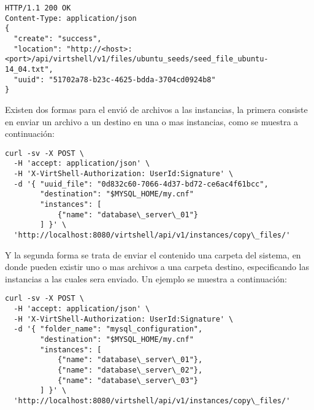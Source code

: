 \vspace{5mm}

\begin{lstlisting}[style=json, caption=Respuesta HTTP del almacenamiento de un archivo.]
HTTP/1.1 200 OK
Content-Type: application/json
{ 
  "create": "success",
  "location": "http://<host>:<port>/api/virtshell/v1/files/ubuntu_seeds/seed_file_ubuntu-14_04.txt",
  "uuid": "51702a78-b23c-4625-bdda-3704cd0924b8" 
}
\end{lstlisting}

\vspace{5mm}

Existen dos formas para el envió de archivos a las instancias, la primera consiste en enviar un archivo a un destino en una o mas instancias, como se muestra a continuación:

\vspace{2cm}

\begin{lstlisting}[style=json, caption=Ejemplo del envio de un archivo a una instancia.]
curl -sv -X POST \
  -H 'accept: application/json' \
  -H 'X-VirtShell-Authorization: UserId:Signature' \
  -d '{ "uuid_file": "0d832c60-7066-4d37-bd72-ce6ac4f61bcc",
        "destination": "$MYSQL_HOME/my.cnf"
        "instances": [
            {"name": "database\_server\_01"}
        ] }' \
  'http://localhost:8080/virtshell/api/v1/instances/copy\_files/'
\end{lstlisting}

\vspace{5mm}

Y la segunda forma se trata de enviar el contenido una carpeta del sistema, en donde pueden existir uno o mas archivos a una carpeta destino, especificando las instancias a las cuales sera enviado. Un ejemplo se muestra a continuación:

\vspace{5mm}

\begin{lstlisting}[style=json, caption=Ejemplo del envio de un archivo a varias instancias.]
curl -sv -X POST \
  -H 'accept: application/json' \
  -H 'X-VirtShell-Authorization: UserId:Signature' \
  -d '{ "folder_name": "mysql_configuration",
        "destination": "$MYSQL_HOME/my.cnf"
        "instances": [
            {"name": "database\_server\_01"},
            {"name": "database\_server\_02"},
            {"name": "database\_server\_03"}
        ] }' \
  'http://localhost:8080/virtshell/api/v1/instances/copy\_files/'
\end{lstlisting}

